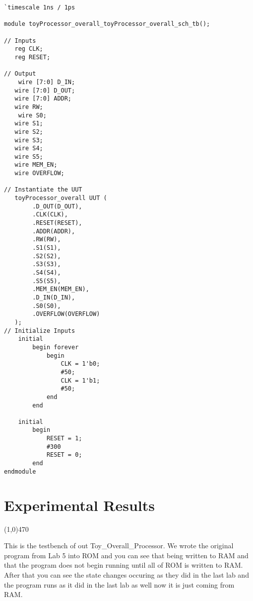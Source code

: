 \documentclass[12pt]{article}
\begin{document}
		\begin{Verbatim}[frame=single, fontsize= \small]
`timescale 1ns / 1ps

module toyProcessor_overall_toyProcessor_overall_sch_tb();

// Inputs
   reg CLK;
   reg RESET;

// Output
	wire [7:0] D_IN;
   wire [7:0] D_OUT;
   wire [7:0] ADDR;
   wire RW;
	wire S0;
   wire S1;
   wire S2;
   wire S3;
   wire S4;
   wire S5;
   wire MEM_EN;
   wire OVERFLOW;

// Instantiate the UUT
   toyProcessor_overall UUT (
		.D_OUT(D_OUT), 
		.CLK(CLK), 
		.RESET(RESET), 
		.ADDR(ADDR), 
		.RW(RW), 
		.S1(S1), 
		.S2(S2), 
		.S3(S3), 
		.S4(S4), 
		.S5(S5), 
		.MEM_EN(MEM_EN), 
		.D_IN(D_IN), 
		.S0(S0), 
		.OVERFLOW(OVERFLOW)
   );
// Initialize Inputs
	initial
		begin forever
			begin
				CLK = 1'b0;
				#50;
				CLK = 1'b1;
				#50;
			end
		end
		
	initial
		begin
			RESET = 1;
			#300
			RESET = 0;
		end
endmodule
		\end{Verbatim}


\newpage			
\section{Experimental Results}\vspace{-.7cm} \line(1,0){470}

\begin{center}
	This is the testbench of out Toy\_Overall\_Processor. We wrote the original program from Lab 5 into ROM and you can see that being written to RAM and that the program does not begin running until all of ROM is written to RAM. After that you can see the state changes occuring as they did in the last lab and the program runs as it did in the last lab as well now it is just coming from RAM.
\end{center}
\end{document}
